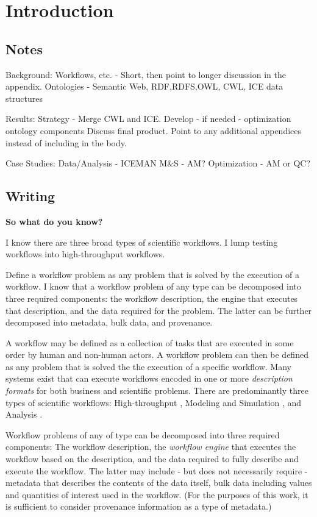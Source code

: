 \chapter{Introduction} \label{ch:introduction}

\section{Notes}

Background:
Workflows, etc. - Short, then point to longer discussion in the appendix.
Ontologies - Semantic Web, {RDF,RDFS,OWL}, CWL, ICE data structures

Results:
Strategy - Merge CWL and ICE. Develop - if needed - optimization ontology components
Discuss final product. Point to any additional appendices instead of including in the body.

Case Studies:
Data/Analysis - ICEMAN
M\&S - AM?
Optimization - AM or QC?

\section{Writing}

\textbf{So what do you know?}

I know there are three broad types of scientific workflows. I lump testing workflows into high-throughput workflows.

Define a workflow problem as any problem that is solved by the execution of a workflow. I know that a workflow problem of any type can be decomposed into three required components: the workflow description, the engine that executes that description, and the data required for the problem. The latter can be further decomposed into metadata, bulk data, and provenance. 

A workflow may be defined as a collection of tasks that are executed in some order by human and non-human actors. A workflow problem can then be defined as any problem that is solved the the execution of a specific workflow. Many systems exist that can execute workflows encoded in one or more \textit{description formats} for both business and scientific problems. There are predominantly three types of scientific workflows: High-throughput \cite{}, Modeling and Simulation \cite{}, and Analysis \cite{}.

Workflow problems of any of type can be decomposed into three required components: The workflow description, the \textit{workflow engine} that executes the workflow based on the description, and the data required to fully describe and execute the workflow. The latter may include - but does not necessarily require - metadata that describes the contents of the data itself, bulk data including values and quantities of interest used in the workflow. (For the purposes of this work, it is sufficient to consider provenance information as a type of metadata.)

